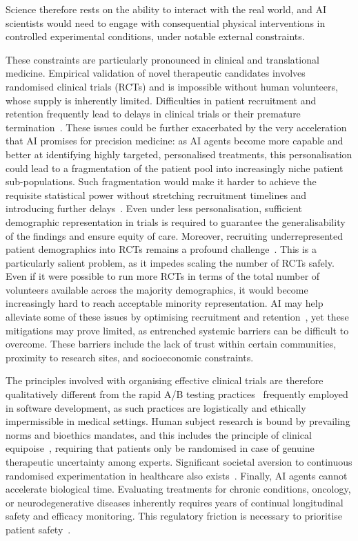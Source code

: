 \documentclass[11pt, a4paper, twocolumn, goog]{google}
\begin{document}
Science therefore rests on the ability to interact with the real world, and AI scientists would need to engage with consequential physical interventions in controlled experimental conditions, under notable external constraints.

These constraints are particularly pronounced in clinical and translational medicine. Empirical validation of novel therapeutic candidates involves randomised clinical trials (RCTs) and is impossible without human volunteers, whose supply is inherently limited. Difficulties in patient recruitment and retention frequently lead to delays in clinical trials or their premature termination~\citep{moffat2023factors}. These issues could be further exacerbated by the very acceleration that AI promises for precision medicine: as AI agents become more capable and better at identifying highly targeted, personalised treatments, this personalisation could lead to a fragmentation of the patient pool into increasingly niche patient sub-populations. Such fragmentation would make it harder to achieve the requisite statistical power without stretching recruitment timelines and introducing further delays~\citep{hee2017does}. Even under less personalisation, sufficient demographic representation in trials is required to guarantee the generalisability of the findings and ensure equity of care. Moreover, recruiting underrepresented patient demographics into RCTs remains a profound challenge~\citep{clark2019increasing, ma2021minority, bibbins2022improving}. This is a particularly salient problem, as it impedes scaling the number of RCTs safely. Even if it were possible to run more RCTs in terms of the total number of volunteers available across the majority demographics, it would become increasingly hard to reach acceptable minority representation. AI may help alleviate some of these issues by optimising recruitment and retention~\citep{lu2024artificial}, yet these mitigations may prove limited, as entrenched systemic barriers can be difficult to overcome. These barriers include the lack of trust within certain communities, proximity to research sites, and socioeconomic constraints.

The principles involved with organising effective clinical trials are therefore qualitatively different from the rapid A/B testing practices~\citep{kohavi2020trustworthy} frequently employed in software development, as such practices are logistically and ethically impermissible in medical settings. Human subject research is bound by prevailing norms and bioethics mandates, and this includes the principle of clinical equipoise~\citep{freedman2017equipoise}, requiring that patients only be randomised in case of genuine therapeutic uncertainty among experts. Significant societal aversion to continuous randomised experimentation in healthcare also exists~\citep{vogt2024aversion}. Finally, AI agents cannot accelerate biological time. Evaluating treatments for chronic conditions, oncology, or neurodegenerative diseases inherently requires years of continual longitudinal safety and efficacy monitoring. This regulatory friction is necessary to prioritise patient safety~\citep{pallmann2018adaptive}.
\end{document}
